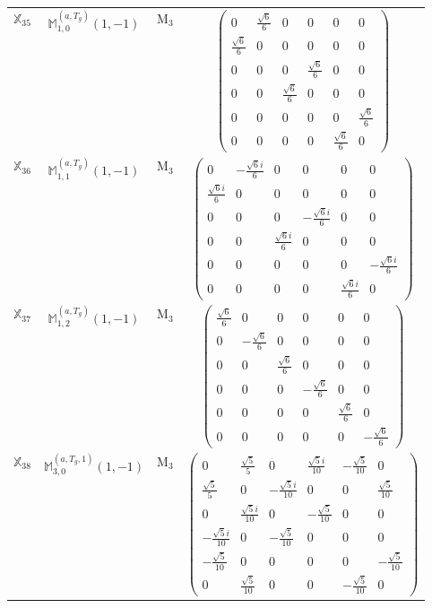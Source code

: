 \documentclass[fleqn,10pt,landscape]{article}
\begin{document}
\begin{itemize}
\begin{center}
\begin{longtable}{c|c|c|c}
$ \mathbb{X}_{35} $ & $\mathbb{M}_{1,0}^{(a,T_{g})}(1,-1)$ & M$_{3}$ & $\begin{pmatrix} 0 & \frac{\sqrt{6}}{6} & 0 & 0 & 0 & 0 \\ \frac{\sqrt{6}}{6} & 0 & 0 & 0 & 0 & 0 \\ 0 & 0 & 0 & \frac{\sqrt{6}}{6} & 0 & 0 \\ 0 & 0 & \frac{\sqrt{6}}{6} & 0 & 0 & 0 \\ 0 & 0 & 0 & 0 & 0 & \frac{\sqrt{6}}{6} \\ 0 & 0 & 0 & 0 & \frac{\sqrt{6}}{6} & 0 \end{pmatrix}$ \\
$ \mathbb{X}_{36} $ & $\mathbb{M}_{1,1}^{(a,T_{g})}(1,-1)$ & M$_{3}$ & $\begin{pmatrix} 0 & - \frac{\sqrt{6} i}{6} & 0 & 0 & 0 & 0 \\ \frac{\sqrt{6} i}{6} & 0 & 0 & 0 & 0 & 0 \\ 0 & 0 & 0 & - \frac{\sqrt{6} i}{6} & 0 & 0 \\ 0 & 0 & \frac{\sqrt{6} i}{6} & 0 & 0 & 0 \\ 0 & 0 & 0 & 0 & 0 & - \frac{\sqrt{6} i}{6} \\ 0 & 0 & 0 & 0 & \frac{\sqrt{6} i}{6} & 0 \end{pmatrix}$ \\
$ \mathbb{X}_{37} $ & $\mathbb{M}_{1,2}^{(a,T_{g})}(1,-1)$ & M$_{3}$ & $\begin{pmatrix} \frac{\sqrt{6}}{6} & 0 & 0 & 0 & 0 & 0 \\ 0 & - \frac{\sqrt{6}}{6} & 0 & 0 & 0 & 0 \\ 0 & 0 & \frac{\sqrt{6}}{6} & 0 & 0 & 0 \\ 0 & 0 & 0 & - \frac{\sqrt{6}}{6} & 0 & 0 \\ 0 & 0 & 0 & 0 & \frac{\sqrt{6}}{6} & 0 \\ 0 & 0 & 0 & 0 & 0 & - \frac{\sqrt{6}}{6} \end{pmatrix}$ \\
$ \mathbb{X}_{38} $ & $\mathbb{M}_{3,0}^{(a,T_{g},1)}(1,-1)$ & M$_{3}$ & $\begin{pmatrix} 0 & \frac{\sqrt{5}}{5} & 0 & \frac{\sqrt{5} i}{10} & - \frac{\sqrt{5}}{10} & 0 \\ \frac{\sqrt{5}}{5} & 0 & - \frac{\sqrt{5} i}{10} & 0 & 0 & \frac{\sqrt{5}}{10} \\ 0 & \frac{\sqrt{5} i}{10} & 0 & - \frac{\sqrt{5}}{10} & 0 & 0 \\ - \frac{\sqrt{5} i}{10} & 0 & - \frac{\sqrt{5}}{10} & 0 & 0 & 0 \\ - \frac{\sqrt{5}}{10} & 0 & 0 & 0 & 0 & - \frac{\sqrt{5}}{10} \\ 0 & \frac{\sqrt{5}}{10} & 0 & 0 & - \frac{\sqrt{5}}{10} & 0 \end{pmatrix}$ \\

\end{longtable}
\end{center}
\end{itemize}
\end{document}
